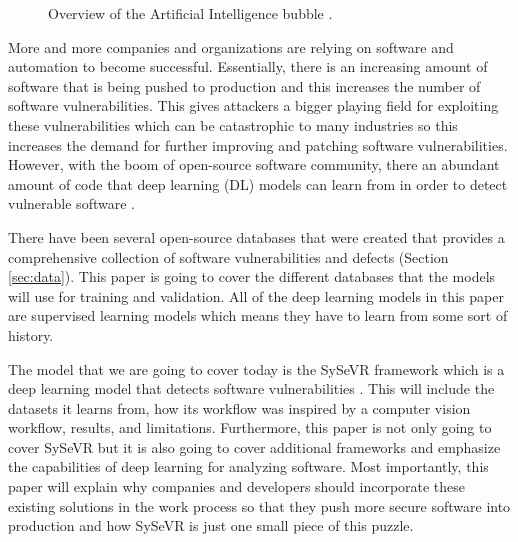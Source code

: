 \documentclass[12pt,twocolumn,letterpaper]{article}
\begin{document}
\begin{figure}[t]
    \centering

    \caption{Overview of the Artificial Intelligence bubble \cite{Oppermann22}.}
    \label{fig:intro-0}
\end{figure}

More and more companies and organizations are relying on software and automation to become successful. 
Essentially, there is an increasing amount of software that is being pushed to production and this increases 
the number of software vulnerabilities. This gives attackers a bigger playing field for exploiting these 
vulnerabilities which can be catastrophic to many industries so this increases the demand for further improving 
and patching software vulnerabilities. However, with the boom of open-source software community, there an 
abundant amount of code that deep learning (DL) models can learn from in order to detect vulnerable software 
\cite{Lin20}. 

There have been several open-source databases that were created that provides a comprehensive collection of 
software vulnerabilities and defects (Section \ref{sec:data}). This paper is going to cover the different databases that the models 
will use for training and validation. All of the deep learning models in this paper are supervised learning 
models which means they have to learn from some sort of history.

The model that we are going to cover today is the SySeVR framework which is a deep learning model that detects 
software vulnerabilities \cite{Li22}. This will include the datasets it learns from, how its workflow was inspired by 
a computer vision workflow, results, and limitations. Furthermore, this paper is not only going to cover 
SySeVR but it is also going to cover additional frameworks and emphasize the capabilities of deep 
learning for analyzing software. Most importantly, this paper will explain why companies and developers 
should incorporate these existing solutions in the work process so that they push more secure software 
into production and how SySeVR is just one small piece of this puzzle.
\end{document}
